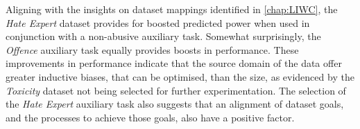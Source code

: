 Aligning with the insights on dataset mappings identified in \cref{chap:LIWC}, the \textit{Hate Expert} dataset provides for boosted predicted power when used in conjunction with a non-abusive auxiliary task.
Somewhat surprisingly, the \textit{Offence} auxiliary task equally provides boosts in performance.
These improvements in performance indicate that the source domain of the data offer greater inductive biases, that can be optimised, than the size, as evidenced by the \textit{Toxicity} dataset not being selected for further experimentation.
The selection of the \textit{Hate Expert} auxiliary task also suggests that an alignment of dataset goals, and the processes to achieve those goals, also have a positive factor.

\begin{table}[]
  \centering
\end{table}
